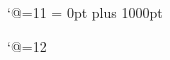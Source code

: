\catcode`@=11
\newskip\@centering
\@centering = 0pt plus 1000pt
\newcount\@eqcnt
\def\@eqncr{& \eqsubmark\cr}
\def\@@eqncr{& \eqsubmark\cr}
\def\m@th{\mathsurround\z@}
\def\numcases#1{%
 \dnumold\dnum%
 \global\advance\dnumold by1%
 \wlabel\thednumold%
 $$%
 \setbox\z@\hbox{ %
  $\displaystyle {#1}\m@th\mskip\medmuskip$}%
\dimen@ii\displaywidth
\setbox\tw@\vbox\bgroup
 \tabskip\@centering\let\\\@eqncr
 \halign to\dimen@ii
 \bgroup
   \kern\wd\z@ \kern13\p@ \global\@eqcnt\@ne$\displaystyle\tabskip\z@{##}$\hfil 
   &\global\@eqcnt\tw@ \quad ##\unskip \hfil\tabskip\@centering
   &\llap{##}\tabskip\z@\cr}

\def\endnumcases{\@@eqncr
 \egroup %
 \setbox\z@\lastbox \nointerlineskip \copy\z@ %
 \g@tboxedwidth\z@ %
\egroup%
\hbox to\displaywidth{%
 \hskip\@centering \hbox to\dimen@i{$\displaystyle \box\z@ %
  \dimen@\ht\tw@ \advance\dimen@\dp\tw@ %
  \left\{\vcenter to\dimen@{\vfil}\right.\n@space %
  $\hfil}\hskip\@centering %
 \kern-\displaywidth $\vcenter{\box\tw@}$%
}%
\global\dsubnum=0
$$}

\def\g@tboxedwidth#1{\setbox#1\hbox{\unhbox#1\global\dimen@i\z@ 
  \G@tBoxedWidth}}
\def\G@tBoxedWidth{\unskip\unskip\unskip \setbox\z@\lastbox 
 \ifvoid\z@\else \global\advance\dimen@i\wd\z@ \expandafter\G@tBoxedWidth \fi}
\catcode`@=12

%

